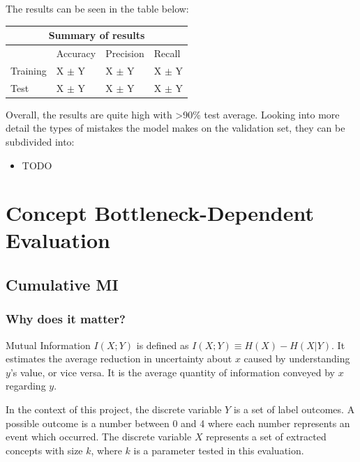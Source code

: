 The results can be seen in the table below:

\begin{center}
\begin{tabular}{ |p{3cm}||p{3cm}|p{3cm}|p{3cm}|  }
 \hline
 \multicolumn{4}{|c|}{Summary of results} \\
 \hline
  &Accuracy&Precision&Recall\\ 
 \hline
 Training  & X $\pm$ Y & X $\pm$ Y & X $\pm$ Y \\
 Test & X $\pm$ Y & X $\pm$ Y & X $\pm$ Y \\
 \hline
\end{tabular}
\end{center}

Overall, the results are quite high with >90\% test average.
Looking into more detail the types of mistakes the model makes on the validation set, they can be subdivided into:

\begin{itemize}
    \item TODO
\end{itemize}


\section{Concept Bottleneck-Dependent Evaluation}

\subsection{Cumulative MI}

\subsubsection{Why does it matter?}

Mutual Information $I(X;Y)$ is defined as $I(X; Y) \equiv H(X) - H(X|Y)$. 
It estimates the average reduction in uncertainty about $x$ caused by understanding $y$'s value, or vice versa. 
It is the average quantity of information conveyed by $x$ regarding $y$.

In the context of this project, the discrete variable $Y$ is a set of label outcomes. A possible outcome is a number between 0 and 4 where each number represents an event which occurred.
The discrete variable $X$ represents a set of extracted concepts with size $k$, where $k$ is a parameter  tested in this evaluation.

